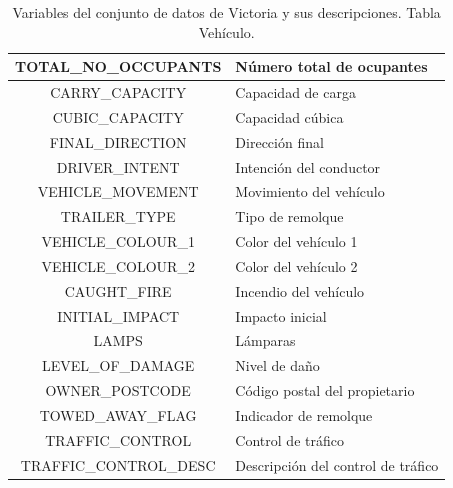 \documentclass{uathesis-es}
\begin{document}
{\begin{table}[H]
\begin{center}
\begin{tabular}{|c|l|}
            TOTAL\_NO\_OCCUPANTS & Número total de ocupantes \\ \hline
            CARRY\_CAPACITY & Capacidad de carga \\ \hline
            CUBIC\_CAPACITY & Capacidad cúbica \\ \hline
            FINAL\_DIRECTION & Dirección final \\ \hline
            DRIVER\_INTENT & Intención del conductor \\ \hline
            VEHICLE\_MOVEMENT & Movimiento del vehículo \\ \hline
            TRAILER\_TYPE & Tipo de remolque \\ \hline
            VEHICLE\_COLOUR\_1 & Color del vehículo 1 \\ \hline
            VEHICLE\_COLOUR\_2 & Color del vehículo 2 \\ \hline
            CAUGHT\_FIRE & Incendio del vehículo \\ \hline
            INITIAL\_IMPACT & Impacto inicial \\ \hline
            LAMPS & Lámparas \\ \hline
            LEVEL\_OF\_DAMAGE & Nivel de daño \\ \hline
            OWNER\_POSTCODE & Código postal del propietario \\ \hline
            TOWED\_AWAY\_FLAG & Indicador de remolque \\ \hline
            TRAFFIC\_CONTROL & Control de tráfico \\ \hline
            TRAFFIC\_CONTROL\_DESC & Descripción del control de tráfico \\ \hline
        \end{tabular}
    \end{center}
    \caption{Variables del conjunto de datos de Victoria y sus descripciones. Tabla Vehículo.}
    \label{Victoria_VEHICLE_TABLE}
\end{table} 

}
\end{document}
